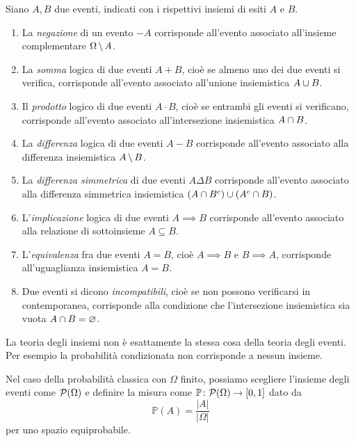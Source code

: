 \documentclass[a4paper]{article}
\begin{document}
Siano \(A, B\) due eventi, indicati con i rispettivi insiemi di esiti \(A\) e \(B\).
\begin{enumerate}
    \item La \emph{negazione} di un evento \(-A\) corrisponde all'evento associato all'insieme complementare \(\Omega \,\backslash\, A\).
    \item La \emph{somma} logica di due eventi \(A+B\), cioè se almeno uno dei due eventi si verifica, corrisponde all'evento associato all'unione insiemistica \(A \cup B\).
    \item Il \emph{prodotto} logico di due eventi \(A\cdot B\), cioè se entrambi gli eventi si verificano, corrisponde all'evento associato all'intersezione insiemistica \(A \cap B\).
    \item La \emph{differenza} logica di due eventi \(A - B\) corrisponde all'evento associato alla differenza insiemistica \(A \,\backslash\, B\).
    \item La \emph{differenza simmetrica} di due eventi \(A\Delta B\) corrisponde all'evento associato alla differenza simmetrica insiemistica \((A \cap B^c) \cup (A^c \cap B)\).
    \item L'\emph{implicazione} logica di due eventi \(A\implies B\) corrisponde all'evento associato alla relazione di sottoinsieme \(A \subseteq B\).
    \item L'\emph{equivalenza} fra due eventi \(A = B\), cioè \(A \implies B\) e \(B \implies A\), corrisponde all'uguaglianza insiemistica \(A = B\).
    \item Due eventi si dicono \emph{incompatibili}, cioè se non possono verificarsi in contemporanea, corrisponde alla condizione che l'intersezione insiemistica sia vuota \(A \cap B = \varnothing\).
\end{enumerate}

La teoria degli insiemi non è esattamente la stessa cosa della teoria degli eventi.
Per esempio la probabilità condizionata non corrisponde a nessun insieme.

\begin{snippetdefinition}{}
    Nel caso della probabilità classica con \(\Omega\) finito, possiamo scegliere l'insieme
    degli eventi come \(\mathcal P(\Omega)\)
    e definire la misura come \(\mathbb P \colon \mathcal P(\Omega) \to [0,1]\) dato da
    \[
        \mathbb P (A) = \frac{|A|}{|\Omega|}
    \]
    per uno spazio equiprobabile.
\end{snippetdefinition}
\end{document}
